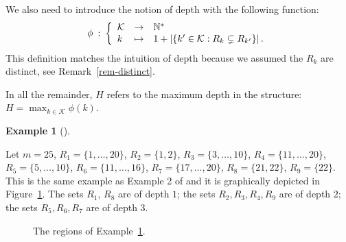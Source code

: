 \documentclass[
  11pt,
  a4paper,
]{article}
\theoremstyle{plain}
\theoremstyle{definition}
\newtheorem{example}{Example}[section]
\theoremstyle{plain}
\theoremstyle{definition}
\theoremstyle{plain}
\theoremstyle{remark}
\begin{document}
We also need to introduce the notion of depth with the following
function: \begin{equation}
\phi \:  : \: \left\{
\begin{array}{l  c l  }
 \mathcal{K}& \to & \mathbb{N}^*\\
k & \mapsto & 1 + \left| \{k'\in\mathcal{K}: R_k\subsetneq R_{k'} \} \right|   .
\end{array}
\right.
\label{eq-depth}
\end{equation} This definition matches the intuition of depth because we
assumed the \(R_k\) are distinct, see Remark~\ref{rem-distinct}.

In all the remainder, \(H\) refers to the maximum depth in the
structure: \(H=\max_{k\in\mathcal{K}}\phi(k)\).

\begin{example}[]\protect\hypertarget{exm-toy-forest}{}\label{exm-toy-forest}

Let \(m=25\), \(R_1 = \{1, \dotsc , 20 \}\), \(R_2  =  \{1, 2  \}\),
\(R_3   =   \{3 , \dotsc , 10 \}\), \(R_4  =    \{11, \dotsc , 20 \}\),
\(R_5 =  \{5, \dotsc , 10 \}\), \(R_6   =     \{11, \dotsc , 16 \}\),
\(R_7  =   \{17, \dotsc ,20  \}\), \(R_8=\{21,22\}\), \(R_9 = \{22\}\).
This is the same example as Example 2 of \citet{MR4178188} and it is
graphically depicted in Figure~\ref{fig-forest-exm}. The sets \(R_1\),
\(R_8\) are of depth \(1\); the sets \(R_2,R_3,R_4,R_9\) are of depth
\(2\); the sets \(R_5,R_6,R_7\) are of depth \(3\).

\end{example}

\begin{figure}


\caption{\label{fig-forest-exm}The regions of
Example~\ref{exm-toy-forest}.}

\end{figure}%
\end{document}
